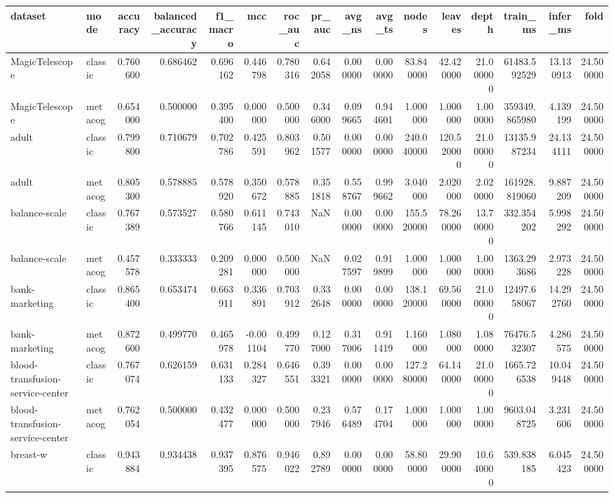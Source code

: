 \begin{tabular}{llrrrrrrrrrrrrrr}
\toprule
dataset & mode & accuracy & balanced_accuracy & f1_macro & mcc & roc_auc & pr_auc & avg_ns & avg_ts & nodes & leaves & depth & train_ms & infer_ms & fold \\
\midrule
MagicTelescope & classic & 0.760600 & 0.686462 & 0.696162 & 0.446798 & 0.780316 & 0.642058 & 0.000000 & 0.000000 & 83.840000 & 42.420000 & 21.000000 & 61483.592529 & 13.130913 & 24.500000 \\
MagicTelescope & metacog & 0.654000 & 0.500000 & 0.395400 & 0.000000 & 0.500000 & 0.346000 & 0.099665 & 0.944601 & 1.000000 & 1.000000 & 1.000000 & 359349.865980 & 4.139199 & 24.500000 \\
adult & classic & 0.799800 & 0.710679 & 0.702786 & 0.425591 & 0.803962 & 0.501577 & 0.000000 & 0.000000 & 240.040000 & 120.520000 & 21.000000 & 13135.987234 & 24.134111 & 24.500000 \\
adult & metacog & 0.805300 & 0.578885 & 0.578920 & 0.350672 & 0.578885 & 0.351818 & 0.558767 & 0.999662 & 3.040000 & 2.020000 & 2.020000 & 161928.819060 & 9.887209 & 24.500000 \\
balance-scale & classic & 0.767389 & 0.573527 & 0.580766 & 0.611145 & 0.743010 & NaN & 0.000000 & 0.000000 & 155.520000 & 78.260000 & 13.700000 & 332.354202 & 5.998292 & 24.500000 \\
balance-scale & metacog & 0.457578 & 0.333333 & 0.209281 & 0.000000 & 0.500000 & NaN & 0.027597 & 0.919899 & 1.000000 & 1.000000 & 1.000000 & 1363.293686 & 2.973228 & 24.500000 \\
bank-marketing & classic & 0.865400 & 0.653474 & 0.663911 & 0.336891 & 0.703912 & 0.332648 & 0.000000 & 0.000000 & 138.120000 & 69.560000 & 21.000000 & 12497.658067 & 14.292760 & 24.500000 \\
bank-marketing & metacog & 0.872600 & 0.499770 & 0.465978 & -0.001104 & 0.499770 & 0.127000 & 0.317006 & 0.911419 & 1.160000 & 1.080000 & 1.080000 & 76476.532307 & 4.286575 & 24.500000 \\
blood-transfusion-service-center & classic & 0.767074 & 0.626159 & 0.631133 & 0.284327 & 0.646551 & 0.393321 & 0.000000 & 0.000000 & 127.280000 & 64.140000 & 21.000000 & 1665.726538 & 10.049448 & 24.500000 \\
blood-transfusion-service-center & metacog & 0.762054 & 0.500000 & 0.432477 & 0.000000 & 0.500000 & 0.237946 & 0.576489 & 0.174704 & 1.000000 & 1.000000 & 1.000000 & 9603.048725 & 3.231606 & 24.500000 \\
breast-w & classic & 0.943884 & 0.934438 & 0.937395 & 0.876575 & 0.946022 & 0.892789 & 0.000000 & 0.000000 & 58.800000 & 29.900000 & 10.640000 & 539.838185 & 6.045423 & 24.500000 \\

\end{tabular}
